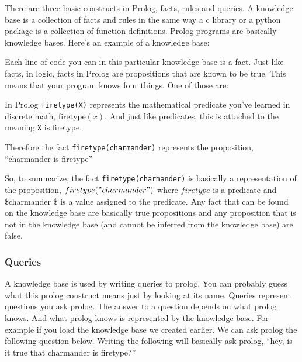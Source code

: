 There are three basic constructs in Prolog, facts, rules and queries. A
knowledge base is a collection of facts and rules in the same way a c
library or a python package is a collection of function definitions.
Prolog programs are basically knowledge bases. Here's an example of a
knowledge base:

\begin{Shaded}
\begin{Highlighting}[]
\end{Highlighting}
\end{Shaded}

Each line of code you can in this particular knowledge base is a fact.
Just like facts, in logic, facts in Prolog are propositions that are
known to be true. This means that your program knows four things. One of
those are:

\begin{Shaded}
\begin{Highlighting}[]
\end{Highlighting}
\end{Shaded}

In Prolog \texttt{firetype(X)} represents the mathematical predicate
you've learned in discrete math, \(\text{firetype}(x)\). And just like
predicates, this is attached to the meaning \texttt{X} is firetype.

Therefore the fact \texttt{firetype(charmander)} represents the
proposition, ``charmander is firetype''

So, to summarize, the fact \texttt{firetype(charmander)} is basically a
representation of the proposition, \(firetype("charmander")\) where
\(firetype\) is a predicate and \$charmander \$ is a value assigned to
the predicate. Any fact that can be found on the knowledge base are
basically true propositions and any proposition that is not in the
knowledge base (and cannot be inferred from the knowledge base) are
false.

\subsubsection{Queries}\label{logic-programming-paradigm.md__queries}

A knowledge base is used by writing queries to prolog. You can probably
guess what this prolog construct means just by looking at its name.
Queries represent questions you ask prolog. The answer to a question
depends on what prolog knows. And what prolog knows is represented by
the knowledge base. For example if you load the knowledge base we
created earlier. We can ask prolog the following question below. Writing
the following will basically ask prolog, ``hey, is it true that
charmander is firetype?''

